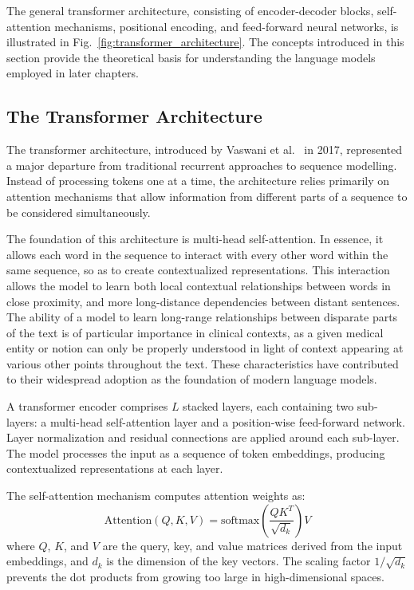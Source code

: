 The general transformer architecture, consisting of encoder-decoder blocks, self-attention mechanisms, positional encoding, and feed-forward neural networks, is illustrated in Fig.~\ref{fig:transformer_architecture}. The concepts introduced in this section provide the theoretical basis for understanding the language models employed in later chapters.

\subsection{The Transformer Architecture}

The transformer architecture, introduced by Vaswani et al.~\cite{ref76} in 2017, represented a major departure from traditional recurrent approaches to sequence modelling. Instead of processing tokens one at a time, the architecture relies primarily on attention mechanisms that allow information from different parts of a sequence to be considered simultaneously.

The foundation of this architecture is multi-head self-attention. In essence, it allows each word in the sequence to interact with every other word within the same sequence, so as to create contextualized representations. This interaction allows the model to learn both local contextual relationships between words in close proximity, and more long-distance dependencies between distant sentences. The ability of a model to learn long-range relationships between disparate parts of the text is of particular importance in clinical contexts, as a given medical entity or notion can only be properly understood in light of context appearing at various other points throughout the text. These characteristics have contributed to their widespread adoption as the foundation of modern language models.

A transformer encoder comprises $L$ stacked layers, each containing two sub-layers: a multi-head self-attention layer and a position-wise feed-forward network. Layer normalization and residual connections are applied around each sub-layer. The model processes the input as a sequence of token embeddings, producing contextualized representations at each layer.

The self-attention mechanism computes attention weights as:
\begin{equation}
\text{Attention}(Q, K, V) = \text{softmax}\left(\frac{QK^T}{\sqrt{d_k}}\right) V
\label{eq:self_attention}
\end{equation}
where $Q$, $K$, and $V$ are the query, key, and value matrices derived from the input embeddings, and $d_k$ is the dimension of the key vectors. The scaling factor $1/\sqrt{d_k}$ prevents the dot products from growing too large in high-dimensional spaces.

